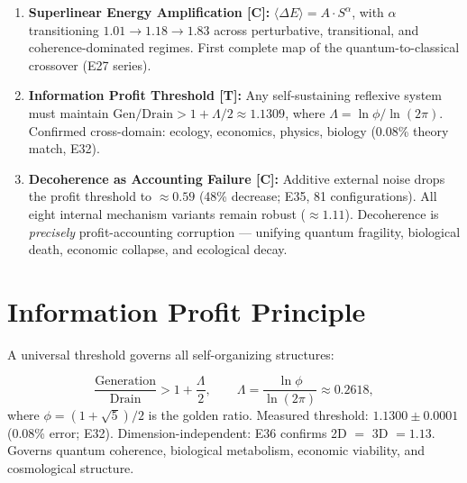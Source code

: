 \documentclass[11pt]{article}
\newcommand{\tagT}{\textbf{[T]}}
\newcommand{\tagC}{\textbf{[C]}}
\theoremstyle{plain}
\theoremstyle{definition}
\theoremstyle{remark}
\begin{document}
\begin{tcolorbox}[colback=gray!4,colframe=gray!50!black,
  title={\textbf{Three Universal Information-Energetic Laws}},
  fonttitle=\bfseries,left=5pt,right=5pt,top=4pt,bottom=4pt]
\small
\begin{enumerate}[nosep,leftmargin=1.5em,itemsep=0.2em]
  \item \textbf{Superlinear Energy Amplification \tagC{}:}
    $\langle\Delta E\rangle = A\cdot S^\alpha$, with $\alpha$ transitioning
    $1.01\to1.18\to1.83$ across perturbative, transitional, and coherence-dominated regimes.
    First complete map of the quantum-to-classical crossover (E27 series).

  \item \textbf{Information Profit Threshold \tagT{}:}
    Any self-sustaining reflexive system must maintain
    $\mathrm{Gen}/\mathrm{Drain} > 1 + \Lambda/2 \approx 1.1309$,
    where $\Lambda = \ln\phi/\ln(2\pi)$.
    Confirmed cross-domain: ecology, economics, physics, biology (0.08\% theory match, E32).

  \item \textbf{Decoherence as Accounting Failure \tagC{}:}
    Additive external noise drops the profit threshold to $\approx0.59$ (48\% decrease; E35, 81 configurations).
    All eight internal mechanism variants remain robust ($\approx1.11$).
    Decoherence is \emph{precisely} profit-accounting corruption --- unifying
    quantum fragility, biological death, economic collapse, and ecological decay.
\end{enumerate}
\end{tcolorbox}

\section{Information Profit Principle}
\label{sec:ipp}

A universal threshold governs all self-organizing structures:

\begin{tcolorbox}[colback=blue!4,colframe=MidnightBlue,title=\textbf{Information Profit Principle \tagC{}}]
\[
\frac{\text{Generation}}{\text{Drain}} > 1 + \frac{\Lambda}{2}, \qquad
\Lambda = \frac{\ln\phi}{\ln(2\pi)} \approx 0.2618,
\]
where $\phi = (1+\sqrt{5})/2$ is the golden ratio.
Measured threshold: $1.1300 \pm 0.0001$ (0.08\% error; E32).
Dimension-independent: E36 confirms 2D $=$ 3D $= 1.13$.
Governs quantum coherence, biological metabolism, economic viability, and cosmological structure.
\end{tcolorbox}
\end{document}
